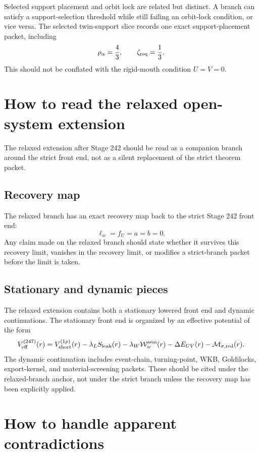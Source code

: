 Selected support placement and orbit lock are related but distinct.  A branch can satisfy a support-selection threshold while still failing an orbit-lock condition, or vice versa.  The selected twin-support slice records one exact support-placement packet, including
\[
\rho_\alpha=\frac43,
\qquad
\zeta_{\rm req}=\frac13.
\]
This should not be conflated with the rigid-mouth condition \(U=V=0\).

\section{How to read the relaxed open-system extension}
\label{sec:how-to-read-relaxed-extension}

The relaxed extension after Stage 242 should be read as a companion branch around the strict front end, not as a silent replacement of the strict theorem packet.

\subsection{Recovery map}
\label{subsec:relaxed-recovery-map}

The relaxed branch has an exact recovery map back to the strict Stage 242 front end:
\[
\ell_w=f_U=a=b=0.
\]
Any claim made on the relaxed branch should state whether it survives this recovery limit, vanishes in the recovery limit, or modifies a strict-branch packet before the limit is taken.

\subsection{Stationary and dynamic pieces}
\label{subsec:relaxed-stationary-dynamic}

The relaxed extension contains both a stationary lowered front end and dynamic continuations.  The stationary front end is organized by an effective potential of the form
\[
V_{\rm eff}^{(247)}(r)
=
V_{\rm short}^{(1p)}(r)
-
\lambda_LS_{\rm leak}(r)
-
\lambda_W\mathcal W_w^{\rm sess}(r)
-
\Delta E_{UV}(r)
-
\mathcal M_{\sigma,\rm red}(r).
\]
The dynamic continuation includes event-chain, turning-point, WKB, Goldilocks, export-kernel, and material-screening packets.  These should be cited under the relaxed-branch anchor, not under the strict branch unless the recovery map has been explicitly applied.

\section{How to handle apparent contradictions}
\label{sec:apparent-contradictions}

